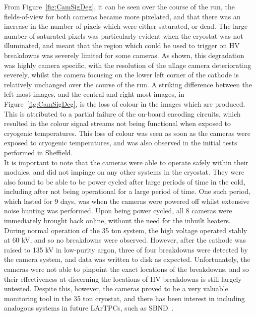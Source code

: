 From Figure~\ref{fig:CamSigDeg}, it can be seen over the course of the run, the fields-of-view for both cameras became more pixelated, and that there was an increase in the number of pixels which were either saturated, or dead. The large number of saturated pixels was particularly evident when the cryostat was not illuminated, and meant that the region which could be used to trigger on HV breakdowns was severely limited for some cameras. As shown, this degradation was highly camera specific, with the resolution of the ullage camera deteriorating severely, whilst the camera focusing on the lower left corner of the cathode is relatively unchanged over the course of the run. A striking difference between the left-most images, and the central and right-most images, in Figure~\ref{fig:CamSigDeg}, is the loss of colour in the images which are produced. This is attributed to a partial failure of the on-board encoding circuits, which resulted in the colour signal streams not being functional when exposed to cryogenic temperatures. This loss of colour was seen as soon as the cameras were exposed to cryogenic temperatures, and was also observed in the initial tests performed in Sheffield. \\

It is important to note that the cameras were able to operate safely within their modules, and did not impinge on any other systems in the cryostat. They were also found to be able to be power cycled after large periods of time in the cold, including after not being operational for a large period of time. One such period, which lasted for 9 days, was when the cameras were powered off whilst extensive noise hunting was performed. Upon being power cycled, all 8 cameras were immediately brought back online, without the need for the inbuilt heaters. \\

During normal operation of the 35 ton system, the high voltage operated stably at 60 kV, and so no breakdowns were observed. However, after the cathode was raised to 135 kV in low-purity argon, three of four breakdowns were detected by the camera system, and data was written to disk as expected. Unfortunately, the cameras were not able to pinpoint the exact locations of the breakdowns, and so their effectiveness at discerning the locations of HV breakdowns is still largely untested. Despite this, however, the cameras proved to be a very valuable monitoring tool in the 35 ton cryostat, and there has been interest in including analogous systems in future LArTPCs, such as SBND~\citep{SBNProposal}. \\
